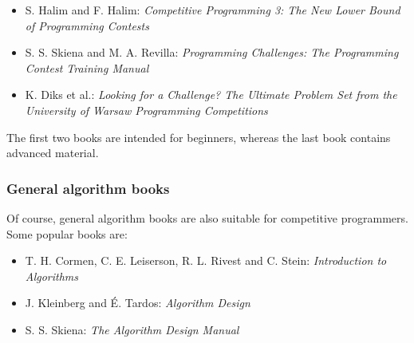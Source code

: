 \begin{itemize}
\item S. Halim and F. Halim:
\emph{Competitive Programming 3: The New Lower Bound of Programming Contests} \cite{hal13}
\item S. S. Skiena and M. A. Revilla:
\emph{Programming Challenges: The Programming Contest Training Manual} \cite{ski03}
\item K. Diks et al.: \emph{Looking for a Challenge? The Ultimate Problem Set from
the University of Warsaw Programming Competitions} \cite{dik12}
\end{itemize}

The first two books are intended for beginners,
whereas the last book contains advanced material.

\subsubsection{General algorithm books}

Of course, general algorithm books are also suitable for
competitive programmers.
Some popular books are:

\begin{itemize}
\item T. H. Cormen, C. E. Leiserson, R. L. Rivest and C. Stein:
\emph{Introduction to Algorithms} \cite{cor09}
\item J. Kleinberg and É. Tardos:
\emph{Algorithm Design} \cite{kle05}
\item S. S. Skiena:
\emph{The Algorithm Design Manual} \cite{ski08}
\end{itemize}

